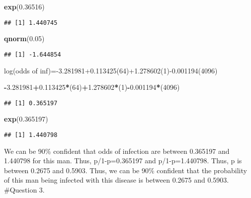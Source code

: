 \documentclass[]{article}
\newenvironment{Shaded}{\begin{snugshade}}{\end{snugshade}}
\newcommand{\KeywordTok}[1]{\textcolor[rgb]{0.13,0.29,0.53}{\textbf{#1}}}
\newcommand{\DecValTok}[1]{\textcolor[rgb]{0.00,0.00,0.81}{#1}}
\newcommand{\FloatTok}[1]{\textcolor[rgb]{0.00,0.00,0.81}{#1}}
\newcommand{\OperatorTok}[1]{\textcolor[rgb]{0.81,0.36,0.00}{\textbf{#1}}}
\newcommand{\NormalTok}[1]{#1}
\begin{document}
\begin{Shaded}
\begin{Highlighting}[]
\KeywordTok{exp}\NormalTok{(}\FloatTok{0.36516}\NormalTok{)}
\end{Highlighting}
\end{Shaded}

\begin{verbatim}
## [1] 1.440745
\end{verbatim}

\begin{Shaded}
\begin{Highlighting}[]
\KeywordTok{qnorm}\NormalTok{(}\FloatTok{0.05}\NormalTok{)}
\end{Highlighting}
\end{Shaded}

\begin{verbatim}
## [1] -1.644854
\end{verbatim}

log(odds of inf)=-3.281981+0.113425(64)+1.278602(1)-0.001194(4096)

\begin{Shaded}
\begin{Highlighting}[]
\OperatorTok{-}\FloatTok{3.281981}\OperatorTok{+}\FloatTok{0.113425}\OperatorTok{*}\NormalTok{(}\DecValTok{64}\NormalTok{)}\OperatorTok{+}\FloatTok{1.278602}\OperatorTok{*}\NormalTok{(}\DecValTok{1}\NormalTok{)}\OperatorTok{-}\FloatTok{0.001194}\OperatorTok{*}\NormalTok{(}\DecValTok{4096}\NormalTok{)}
\end{Highlighting}
\end{Shaded}

\begin{verbatim}
## [1] 0.365197
\end{verbatim}

\begin{Shaded}
\begin{Highlighting}[]
\KeywordTok{exp}\NormalTok{(}\FloatTok{0.365197}\NormalTok{)}
\end{Highlighting}
\end{Shaded}

\begin{verbatim}
## [1] 1.440798
\end{verbatim}

We can be 90\% confident that odds of infection are between 0.365197 and
1.440798 for this man. Thus, p/1-p=0.365197 and p/1-p=1.440798. Thus, p
is between 0.2675 and 0.5903. Thus, we can be 90\% confident that the
probability of this man being infected with this disease is between
0.2675 and 0.5903. \#Question 3.
\end{document}

